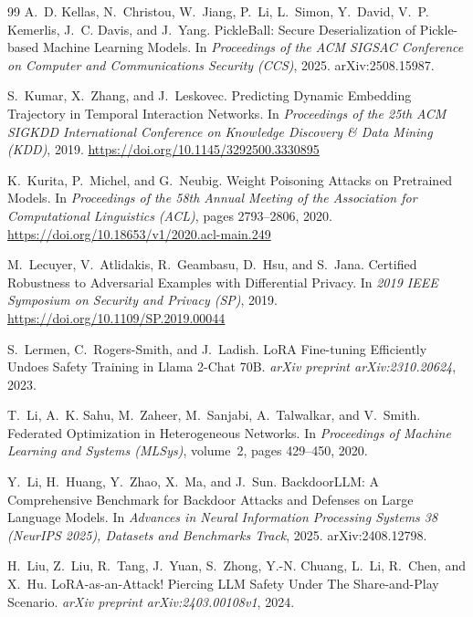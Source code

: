 \begin{thebibliography}{99}
A.~D. Kellas, N.~Christou, W.~Jiang, P.~Li, L.~Simon, Y.~David, V.~P. Kemerlis, J.~C. Davis, and J.~Yang.
\newblock PickleBall: Secure Deserialization of Pickle-based Machine Learning Models.
\newblock In \emph{Proceedings of the ACM SIGSAC Conference on Computer and Communications Security (CCS)}, 2025.
\newblock arXiv:2508.15987.

S.~Kumar, X.~Zhang, and J.~Leskovec.
\newblock Predicting Dynamic Embedding Trajectory in Temporal Interaction Networks.
\newblock In \emph{Proceedings of the 25th ACM SIGKDD International Conference on Knowledge Discovery \& Data Mining (KDD)}, 2019.
\newblock \url{https://doi.org/10.1145/3292500.3330895}

K.~Kurita, P.~Michel, and G.~Neubig.
\newblock Weight Poisoning Attacks on Pretrained Models.
\newblock In \emph{Proceedings of the 58th Annual Meeting of the Association for Computational Linguistics (ACL)}, pages 2793--2806, 2020.
\newblock \url{https://doi.org/10.18653/v1/2020.acl-main.249}

M.~Lecuyer, V.~Atlidakis, R.~Geambasu, D.~Hsu, and S.~Jana.
\newblock Certified Robustness to Adversarial Examples with Differential Privacy.
\newblock In \emph{2019 IEEE Symposium on Security and Privacy (SP)}, 2019.
\newblock \url{https://doi.org/10.1109/SP.2019.00044}

S.~Lermen, C.~Rogers-Smith, and J.~Ladish.
\newblock LoRA Fine-tuning Efficiently Undoes Safety Training in Llama 2-Chat 70B.
\newblock \emph{arXiv preprint arXiv:2310.20624}, 2023.

T.~Li, A.~K. Sahu, M.~Zaheer, M.~Sanjabi, A.~Talwalkar, and V.~Smith.
\newblock Federated Optimization in Heterogeneous Networks.
\newblock In \emph{Proceedings of Machine Learning and Systems (MLSys)}, volume~2, pages 429--450, 2020.

Y.~Li, H.~Huang, Y.~Zhao, X.~Ma, and J.~Sun.
\newblock BackdoorLLM: A Comprehensive Benchmark for Backdoor Attacks and Defenses on Large Language Models.
\newblock In \emph{Advances in Neural Information Processing Systems 38 (NeurIPS 2025), Datasets and Benchmarks Track}, 2025.
\newblock arXiv:2408.12798.

H.~Liu, Z.~Liu, R.~Tang, J.~Yuan, S.~Zhong, Y.-N. Chuang, L.~Li, R.~Chen, and X.~Hu.
\newblock LoRA-as-an-Attack! Piercing LLM Safety Under The Share-and-Play Scenario.
\newblock \emph{arXiv preprint arXiv:2403.00108v1}, 2024.


\end{thebibliography}
